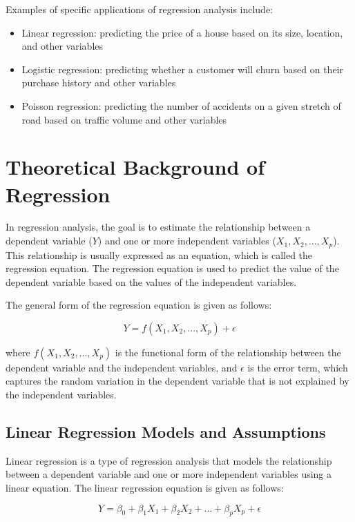 \documentclass{beamer}
\begin{document}
Examples of specific applications of regression analysis include:

\begin{itemize}
\item Linear regression: predicting the price of a house based on its size, location, and other variables
\item Logistic regression: predicting whether a customer will churn based on their purchase history and other variables
\item Poisson regression: predicting the number of accidents on a given stretch of road based on traffic volume and other variables
\end{itemize}

\section{Theoretical Background of Regression}

In regression analysis, the goal is to estimate the relationship between a dependent variable ($Y$) and one or more independent variables ($X_1, X_2, ..., X_p$). This relationship is usually expressed as an equation, which is called the regression equation. The regression equation is used to predict the value of the dependent variable based on the values of the independent variables.

The general form of the regression equation is given as follows:

\begin{equation}
Y = f(X_1, X_2, ..., X_p) + \epsilon
\end{equation}

where $f(X_1, X_2, ..., X_p)$ is the functional form of the relationship between the dependent variable and the independent variables, and $\epsilon$ is the error term, which captures the random variation in the dependent variable that is not explained by the independent variables.

\subsection{Linear Regression Models and Assumptions}
Linear regression is a type of regression analysis that models the relationship between a dependent variable and one or more independent variables using a linear equation. The linear regression equation is given as follows:

\begin{equation}
Y = \beta_0 + \beta_1X_1 + \beta_2X_2 + ... + \beta_pX_p + \epsilon
\end{equation}
\end{document}
